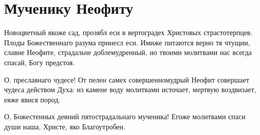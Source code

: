 \section{Мученику Неофиту}\begin{mymulticols}




Новоцветный якоже сад, прозябл еси в вертоградех Христовых страстотерпцев. Плоды Божественнаго разума принесл еси. Имиже питаются верно тя чтущии, славне Неофите, страдальче доблемудренный, но твоими молитвами нас всегда спасай, Богу предстоя.




О, преславнаго чудесе! От пелен самех совершенномудрый Неофит совершает чудеса действом Духа: из камене воду молитвами источает, мертвую воздвизает, еяже явися пород.

О, Божестенных деяний пятострадальнаго мученика! Егоже молитвами спаси души наша, Христе, яко Благоутробен.

\end{mymulticols}

